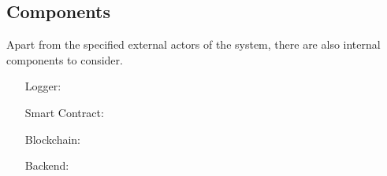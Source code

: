 \subsection{Components}
Apart from the specified external actors of the system, there are also internal components to consider.

\begin{itemize}[align=left,font=\itshape]
    \item[Logger:] 
    \item[Smart Contract:]  
    \item[Blockchain:]
    \item[Backend:]
\end{itemize}

